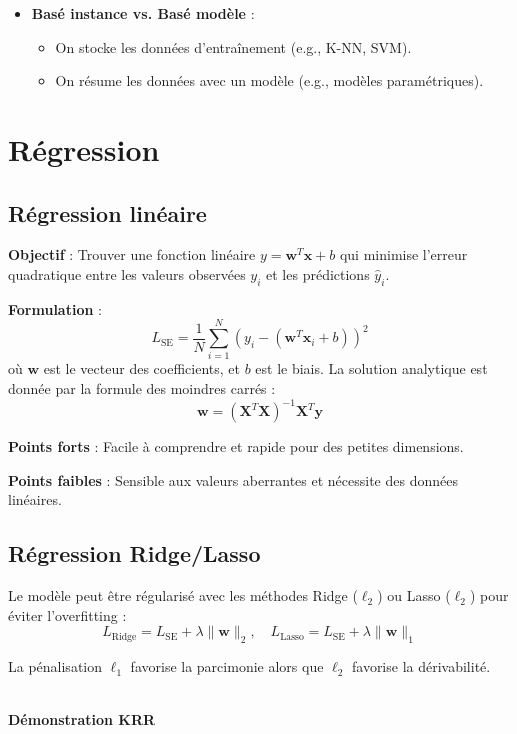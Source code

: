 \documentclass[a4paper,portrait]{article}
\begin{document}
\begin{multicols}{2}
\begin{itemize}
    \item \textbf{Basé instance vs. Basé modèle} :
    \begin{itemize}
        \item On stocke les données d'entraînement (e.g., K-NN, SVM).
        \item On résume les données avec un modèle (e.g., modèles paramétriques).
    \end{itemize}
\end{itemize}

\section{Régression}

\subsection{Régression linéaire}

\textbf{Objectif} : Trouver une fonction linéaire \( y = \mathbf{w}^T \mathbf{x} + b \) qui minimise l'erreur quadratique entre les valeurs observées \( y_i \) et les prédictions \( \hat{y}_i \).

\textbf{Formulation} :
\[
L_{\text{SE}} = \frac{1}{N} \sum_{i=1}^{N} \left( y_i - \left(\mathbf{w}^T \mathbf{x}_i + b \right)\right)^2
\]
où \( \mathbf{w} \) est le vecteur des coefficients, et \( b \) est le biais. La solution analytique est donnée par la formule des moindres carrés :
\[
\mathbf{w} = (\mathbf{X}^T \mathbf{X})^{-1} \mathbf{X}^T \mathbf{y}
\]


\textbf{Points forts} : Facile à comprendre et rapide pour des petites dimensions.

\textbf{Points faibles} : Sensible aux valeurs aberrantes et nécessite des données linéaires.

\subsection{Régression Ridge/Lasso}
Le modèle peut être régularisé avec les méthodes Ridge ($\ell_2$) ou Lasso ($\ell_2$) pour éviter l'overfitting :
\[
L_{\text{Ridge}} = L_{\text{SE}} + \lambda \|\mathbf{w}\|_2, \quad L_{\text{Lasso}} = L_{\text{SE}} + \lambda \|\mathbf{w}\|_1
\]


La pénalisation $\ell_1$ favorise la parcimonie alors que $\ell_2$ favorise la dérivabilité.

\textbf{\\Démonstration KRR}


\end{multicols}
\end{document}
